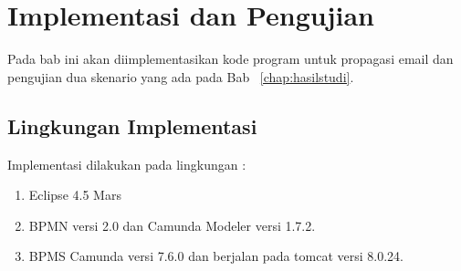 \chapter{Implementasi dan Pengujian}
\label{chap:implementasipengujian}
Pada bab ini akan diimplementasikan kode program untuk propagasi email dan pengujian dua skenario yang ada pada Bab ~\ref{chap:hasilstudi}.

\section{Lingkungan Implementasi}
\label{sec:lingkunganimplementasi}
Implementasi dilakukan pada lingkungan :
\begin{enumerate}
	\item Eclipse 4.5 Mars
	\item BPMN versi 2.0 dan Camunda Modeler versi 1.7.2.
	\item BPMS Camunda versi 7.6.0 dan berjalan pada tomcat versi 8.0.24.
	
\end{enumerate}

